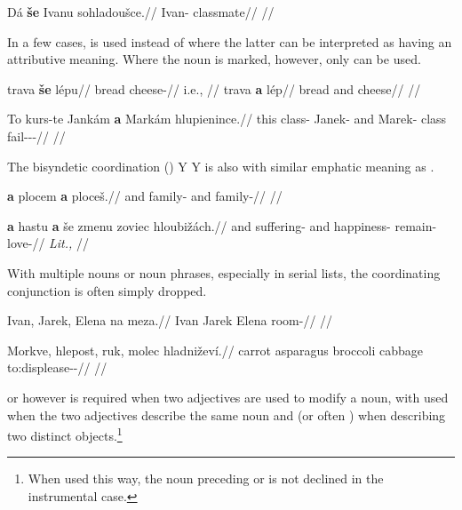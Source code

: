 \pex
\begingl
    \gla Dá \textbf{še} Ivanu sohladoušce.//
    \glb {} \Com{} Ivan-\Ins{} classmate//
    \glft {}//
\endgl
\xe

In a few cases,  is used instead of  where the latter can be interpreted as having an attributive meaning. Where the noun is marked, however, only  can be used.

\begin{multicols}{2}
\pex\a
\begingl
    \gla trava \textbf{še} lépu//
    \glb bread \Com{} cheese-\Ins{}//
    \glft {} i.e., //
\endgl
\a
\begingl
    \gla trava \textbf{a} lép//
    \glb bread and cheese//
    \glft {}//
\endgl
\xe\end{multicols}

\pex
\begingl
    \gla To kurs-te Jankám \textbf{a} Markám hlupienince.//
    \glb this class-\Foc{} Janek-\Agt{} and Marek-\Agt{} class fail-\Pv{}-\Pf{}-\Quot{}//
    \glft {}//
\endgl
\xe


The bisyndetic coordination (\cite{velupillai2012})  Y  Y is also with similar emphatic meaning as .

\pex
\begingl
    \gla \textbf{a} plocem \textbf{a} ploceš.//
    \glb and family-\First{}\Sg{} and family-//
    \glft {}//
\endgl
\xe

\pex
\begingl
    \gla \textbf{a} hastu \textbf{a} še zmenu zoviec hloubižách.//
    \glb and suffering-\mk{} and \Com{} happiness-\Ins{} remain-\Cv{} love-//
    \glft {} \emph{Lit.,} //
\endgl
\xe

With multiple nouns or noun phrases, especially in serial lists, the coordinating conjunction is often simply dropped.

\pex
\begingl
    \gla Ivan, Jarek, Elena na meza.//
    \glb Ivan Jarek Elena \Loc{} room-\Acc{}//
    \glft {}//
\endgl
\xe

\pex
\begingl
    \gla Morkve, hlepost, ruk, molec hladniževí.//
    \glb carrot asparagus broccoli cabbage to:displease-\Av{}-\Cont{}//
    \glft {}//
\endgl
\xe

 or  however is required when two adjectives are used to modify a noun, with  used when the two adjectives describe the same noun and  (or often ) when describing two distinct objects.\footnote{When used this way, the noun preceding  or  is not declined in the instrumental case.}

